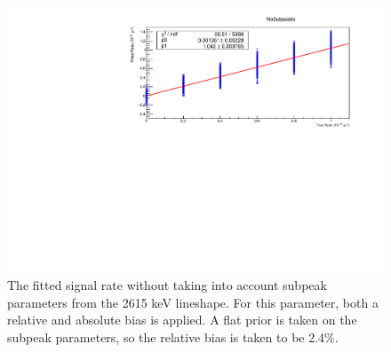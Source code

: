 \begin{figure}
\centering
\includegraphics[width=0.7\linewidth]{Figures/Appendix_Figures/NoSubpeaks.pdf}
\caption[The fitted signal rate without taking into account subpeak parameters from the 2615 keV lineshape]
{The fitted signal rate without taking into account subpeak parameters from the 2615 keV lineshape.
For this parameter, both a relative and absolute bias is applied.
A flat prior is taken on the subpeak parameters, so the relative bias is taken to be 2.4\%.}
\label{fig:nosubpeaks}
\end{figure}